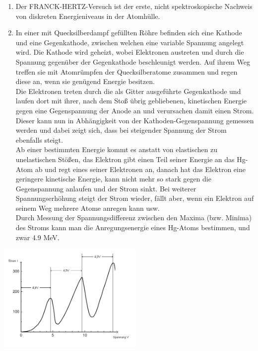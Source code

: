 \documentclass[12pt,a4paper,ngerman]{article}
\begin{document}
\begin{enumerate}
\item Der FRANCK-HERTZ-Versuch ist der erste, nicht spektroskopische Nachweis von diskreten Energieniveaus in der Atomhülle. 
\item In einer mit Quecksilberdampf gefüllten Röhre befinden sich eine Kathode und eine Gegenkathode, zwischen welchen eine variable Spannung angelegt wird. Die Kathode wird geheizt, wobei Elektronen austreten und durch die Spannung gegenüber der Gegenkathode beschleunigt werden. Auf ihrem Weg treffen sie mit Atomrümpfen der Quecksilberatome zusammen und regen diese an, wenn sie genügend Energie besitzen. \\
Die Elektronen treten durch die als Gitter ausgeführte Gegenkathode und laufen dort mit ihrer, nach dem Stoß übrig gebliebenen, kinetischen Energie gegen eine Gegenspannung der Anode an und verursachen damit einen Strom. Dieser kann nun in Abhängigkeit von der Kathoden-Gegenspannung gemessen werden und dabei zeigt sich, dass bei steigender Spannung der Strom ebenfalls steigt. \\
Ab einer bestimmten Energie kommt es anstatt von elastischen zu unelastischen Stößen, das Elektron gibt einen Teil seiner Energie an das Hg-Atom ab und regt eines seiner Elektronen an, danach hat das Elektron eine geringere kinetische Energie, kann nicht mehr so stark gegen die Gegenspannung anlaufen und der Strom sinkt. Bei weiterer Spannungserhöhung steigt der Strom wieder, fällt aber, wenn ein Elektron auf seinem Weg mehrere Atome anregen kann usw. \\
Durch Messung der Spannungsdifferenz zwischen den Maxima (bzw. Minima) des Stroms kann man die Anregungsenergie eines Hg-Atoms bestimmen, und zwar 4.9 MeV. \\
\end{enumerate}

\begin{center}
\includegraphics[width=0.53\textwidth]{franckhertz.jpg} 
\end{center}
\end{document}
